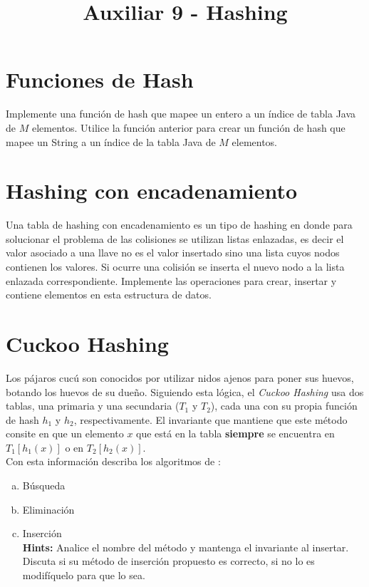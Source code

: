 \documentclass[dcc]{fcfmcourse}
\title{Auxiliar 9 - Hashing}
\begin{document}
\maketitle

\vspace{-1ex}

\section*{Funciones de Hash}
\begin{problems}
\problem Implemente una función de hash que mapee un entero a un índice de tabla Java de $M$ elementos.
\problem Utilice la función anterior para crear un función de hash que mapee un String a un índice de la tabla Java de $M$ elementos.
\end{problems}

\section*{Hashing con encadenamiento}
\begin{problems}
\problem Una tabla de hashing con encadenamiento es un tipo de hashing en donde para solucionar el problema de las colisiones se utilizan listas enlazadas, es decir el valor asociado a una llave no es el valor insertado sino una lista cuyos nodos contienen los valores. Si ocurre una colisión se inserta el nuevo nodo a la lista enlazada correspondiente. Implemente las operaciones para crear, insertar y contiene elementos en esta estructura de datos.
\end{problems}

\section*{Cuckoo Hashing}
\begin{problems}


\problem Los pájaros cucú son conocidos por utilizar nidos ajenos para poner sus huevos, botando los huevos de su dueño. Siguiendo esta lógica, el \textit{Cuckoo Hashing} usa dos tablas, una primaria y una secundaria ($T_1$ y $T_2$), cada una con su propia función de hash $h_1$ y $h_2$, respectivamente. El invariante que mantiene que este método consite en que un elemento $x$ que está en la tabla \textbf{siempre} se encuentra en $T_1[h_1(x)]$ o en $T_2[h_2(x)]$.\\

Con esta información describa los algoritmos de :
\begin{enumerate}[a)]
    \item Búsqueda
    \item Eliminación
    \item Inserción \\\textbf{Hints:} Analice el nombre del método y mantenga el invariante al insertar. \\Discuta si su método de inserción propuesto es correcto, si no lo es modifíquelo para que lo sea.
\end{enumerate}
\end{problems}
\end{document}
